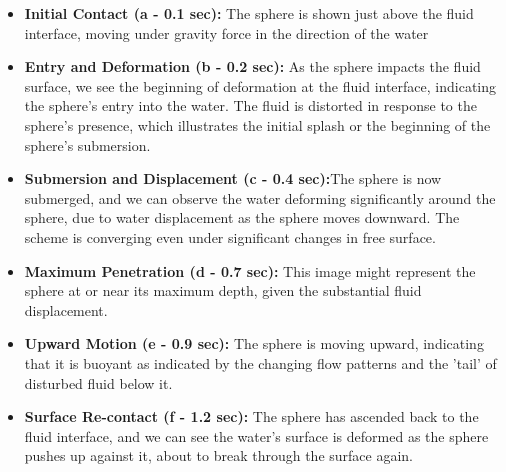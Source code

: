\begin{itemize}
    \item \textbf{Initial Contact (a - 0.1 sec):} The sphere is shown just above the fluid interface, moving under gravity force in the direction of the water
    \item \textbf{Entry and Deformation (b - 0.2 sec):} As the sphere impacts the fluid surface, we see the beginning of deformation at the fluid interface, indicating the sphere's entry into the water. The fluid is distorted in response to the sphere's presence, which illustrates the initial splash or the beginning of the sphere's submersion.
    \item \textbf{Submersion and Displacement (c - 0.4 sec):}The sphere is now submerged, and we can observe the water deforming significantly around the sphere, due to water displacement as the sphere moves downward. The scheme is converging even under significant changes in free surface.
    \item \textbf{Maximum Penetration (d - 0.7 sec):} This image might represent the sphere at or near its maximum depth, given the substantial fluid displacement.
    \item \textbf{Upward Motion (e - 0.9 sec):} The sphere is moving upward, indicating that it is buoyant as indicated by the changing flow patterns and the 'tail' of disturbed fluid below it.
    \item \textbf{Surface Re-contact (f - 1.2 sec):} The sphere has ascended back to the fluid interface, and we can see the water's surface is deformed as the sphere pushes up against it, about to break through the surface again.
\end{itemize}
